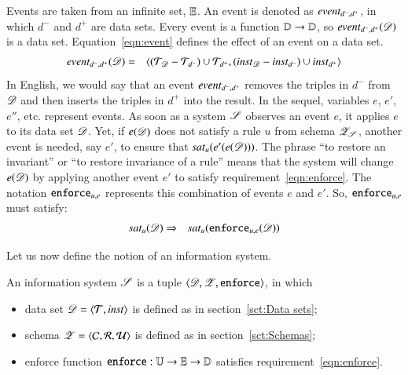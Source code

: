 \documentclass{elsarticle}
\begin{document}
   Events are taken from an infinite set, $\mathbb{E}$.
   An event is denoted as $\text{\it event\/}_{d^-,d^+}$, in which $d^-$ and $d^+$ are data sets.
   Every event is a function $\mathbb{D}\rightarrow\mathbb{D}$, so $\text{\it event\/}_{d^-,d^+}(\mathscr{D})$ is a data set.
   Equation~\ref{eqn:event} defines the effect of an event on a data set.
\begin{eqnarray}
      \text{\it event\/}_{d^-,d^+}(\mathscr{D})&=&\langle(\mathcal{T}_{\mathscr{D}}-\mathcal{T}_{d^-})\cup\mathcal{T}_{d^+},(\mathbin{\text{\it inst\/}}_{\mathscr{D}}-\mathbin{\text{\it inst\/}}_{d^-})\cup\mathbin{\text{\it inst\/}}_{d^+}\rangle
\label{eqn:event}
\end{eqnarray}
   In English, we would say that an event $\text{\it event\/}_{d^-,d^+}$ removes the triples in $d^-$ from $\mathscr{D}$ and then inserts the triples in $d^+$ into the result.
   In the sequel, variables $e$, $e'$, $e''$, etc. represent events.
   As soon as a system $\mathscr{S}$ observes an event $e$,
   it applies $e$ to its data set $\mathscr{D}$.
   Yet, if $e(\mathscr{D})$ does not satisfy a rule $u$ from schema $\mathscr{Z}_{\mathscr{S}}$,
   another event is needed, say $e'$, to ensure that $\text{\it sat\/}_{u}(e'(e(\mathscr{D})))$.
   The phrase ``to restore an invariant'' or ``to restore invariance of a rule''
   means that the system will change $e(\mathscr{D})$ by applying another event $e'$ to satisfy requirement~\ref{eqn:enforce}.
   The notation $\mathbin{{\tt enforce}}_{u,e}$ represents this combination of events $e$ and $e'$.
   So, $\mathbin{{\tt enforce}}_{u,e}$ must satisfy:
\begin{eqnarray}
   \text{\it sat\/}_{u}(\mathscr{D})&\Rightarrow&\text{\it sat\/}_{u}({\tt enforce}_{u,e}(\mathscr{D}))
\label{eqn:enforce}
\end{eqnarray}

   Let us now define the notion of an information system.
\begin{definition}
\label{def:information system}
\item An information system $\mathscr{S}$ is a tuple $\langle{\mathscr{D}},{\mathscr{Z}},{\mathbin{{\tt enforce}}}\rangle$, in which
\begin{itemize}
   \item data set $\mathscr{D}=\langle{\mathcal{T}},{\mathbin{\text{\it inst\/}}}\rangle$ is defined as in section~\ref{sct:Data sets};
   \item schema $\mathscr{Z}=\langle{\mathcal{C}},{\mathcal{R}},{\mathcal{U}}\rangle$ is defined as in section~\ref{sct:Schemas};
   \item enforce function ${\mathbin{{\tt enforce}}}:\mathbb{U}\rightarrow\mathbb{E}\rightarrow\mathbb{D}$ satisfies requirement~\ref{eqn:enforce}.
\end{itemize}
\end{definition}
\end{document}
